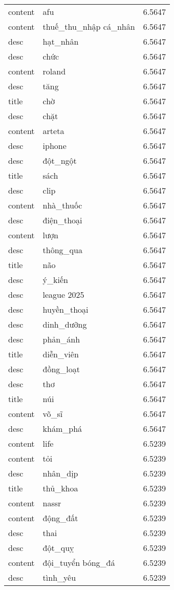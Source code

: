 \documentclass{article}
\begin{document}
\begin{tabular}{lll}
content & afu & 6.5647\\
content & thuế\_thu\_nhập cá\_nhân & 6.5647\\
desc & hạt\_nhân & 6.5647\\
desc & chức & 6.5647\\
content & roland & 6.5647\\
desc & tăng & 6.5647\\
title & chờ & 6.5647\\
desc & chặt & 6.5647\\
content & arteta & 6.5647\\
desc & iphone & 6.5647\\
desc & đột\_ngột & 6.5647\\
title & sách & 6.5647\\
desc & clip & 6.5647\\
content & nhà\_thuốc & 6.5647\\
desc & điện\_thoại & 6.5647\\
content & lượn & 6.5647\\
desc & thông\_qua & 6.5647\\
title & não & 6.5647\\
desc & ý\_kiến & 6.5647\\
desc & league 2025 & 6.5647\\
desc & huyền\_thoại & 6.5647\\
desc & dinh\_dưỡng & 6.5647\\
desc & phản\_ánh & 6.5647\\
title & diễn\_viên & 6.5647\\
desc & đồng\_loạt & 6.5647\\
desc & thơ & 6.5647\\
title & núi & 6.5647\\
content & võ\_sĩ & 6.5647\\
desc & khám\_phá & 6.5647\\
content & life & 6.5239\\
content & tỏi & 6.5239\\
desc & nhân\_dịp & 6.5239\\
title & thủ\_khoa & 6.5239\\
content & nassr & 6.5239\\
content & động\_đất & 6.5239\\
desc & thai & 6.5239\\
desc & đột\_quỵ & 6.5239\\
content & đội\_tuyển bóng\_đá & 6.5239\\
desc & tình\_yêu & 6.5239\\

\end{tabular}
\end{document}
